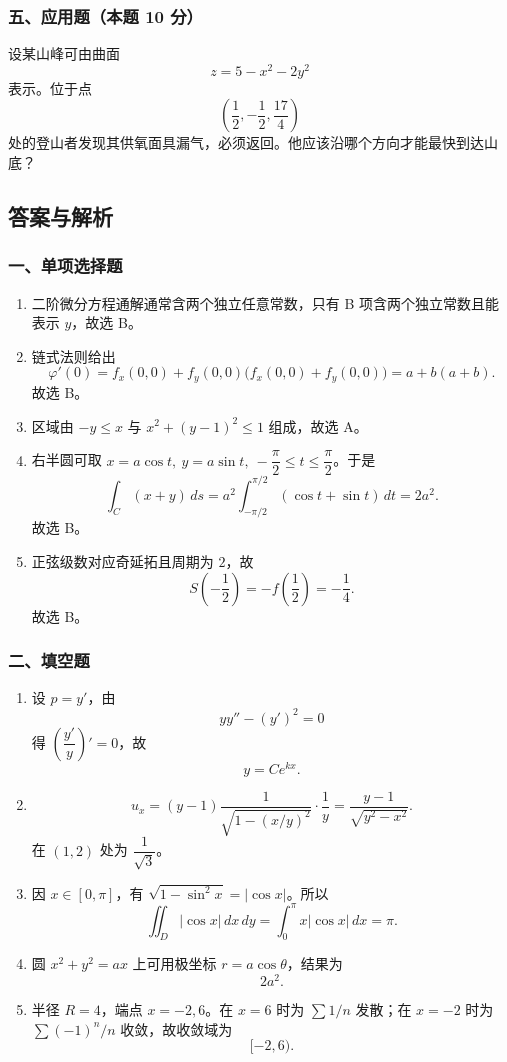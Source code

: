 \subsubsection*{五、应用题（本题 10 分）}
设某山峰可由曲面
\[
z=5-x^2-2y^2
\]
表示。位于点
\[
\left(\frac12,-\frac12,\frac{17}{4}\right)
\]
处的登山者发现其供氧面具漏气，必须返回。他应该沿哪个方向才能最快到达山底？

\subsection{答案与解析}

\subsubsection*{一、单项选择题}
\begin{enumerate}
  \item 二阶微分方程通解通常含两个独立任意常数，只有 B 项含两个独立常数且能表示 $y$，故选 B。
  \item 链式法则给出
  \[
  \varphi'(0)=f_x(0,0)+f_y(0,0)\bigl(f_x(0,0)+f_y(0,0)\bigr)=a+b(a+b).
  \]
  故选 B。
  \item 区域由 $-y\le x$ 与 $x^2+(y-1)^2\le1$ 组成，故选 A。
  \item 右半圆可取 $x=a\cos t,\ y=a\sin t,\ -\dfrac\pi2\le t\le\dfrac\pi2$。于是
  \[
  \int_C(x+y)\,ds=a^2\int_{-\pi/2}^{\pi/2}(\cos t+\sin t)\,dt=2a^2.
  \]
  故选 B。
  \item 正弦级数对应奇延拓且周期为 $2$，故
  \[
  S\!\left(-\frac12\right)=-f\!\left(\frac12\right)=-\frac14.
  \]
  故选 B。
\end{enumerate}

\subsubsection*{二、填空题}
\begin{enumerate}
  \item 设 $p=y'$，由
  \[
  yy''-(y')^2=0
  \]
  得 $\left(\dfrac{y'}{y}\right)'=0$，故
  \[
  y=Ce^{kx}.
  \]
  \item
  \[
  u_x=(y-1)\frac1{\sqrt{1-(x/y)^2}}\cdot\frac1y
  =\frac{y-1}{\sqrt{y^2-x^2}}.
  \]
  在 $(1,2)$ 处为 $\dfrac1{\sqrt3}$。
  \item 因 $x\in[0,\pi]$，有 $\sqrt{1-\sin^2x}=|\cos x|$。所以
  \[
  \iint_D|\cos x|\,dx\,dy=\int_0^\pi x|\cos x|\,dx=\pi.
  \]
  \item 圆 $x^2+y^2=ax$ 上可用极坐标 $r=a\cos\theta$，结果为
  \[
  2a^2.
  \]
  \item 半径 $R=4$，端点 $x=-2,6$。在 $x=6$ 时为 $\sum 1/n$ 发散；在 $x=-2$ 时为 $\sum(-1)^n/n$ 收敛，故收敛域为
  \[
  [-2,6).
  \]
\end{enumerate}


